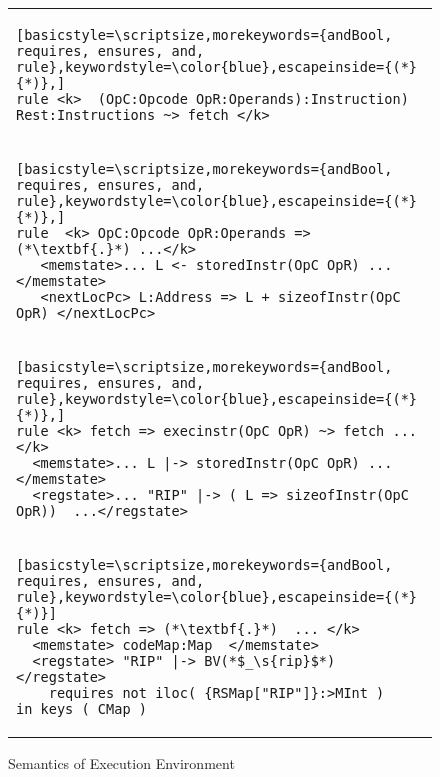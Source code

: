\begin{figure*}[t]
\begin{tabular}{l}      
\begin{lstlisting}[basicstyle=\scriptsize,morekeywords={andBool, requires, ensures, and, rule},keywordstyle=\color{blue},escapeinside={(*}{*)},]
rule <k>  (OpC:Opcode OpR:Operands):Instruction) Rest:Instructions ~> fetch </k>
\end{lstlisting} \\

\begin{lstlisting}[basicstyle=\scriptsize,morekeywords={andBool, requires, ensures, and, rule},keywordstyle=\color{blue},escapeinside={(*}{*)},]
rule  <k> OpC:Opcode OpR:Operands => (*\textbf{.}*) ...</k>
   <memstate>... L <- storedInstr(OpC OpR) ...</memstate>
   <nextLocPc> L:Address => L + sizeofInstr(OpC OpR) </nextLocPc>
\end{lstlisting} \\

\begin{lstlisting}[basicstyle=\scriptsize,morekeywords={andBool, requires, ensures, and, rule},keywordstyle=\color{blue},escapeinside={(*}{*)},]
rule <k> fetch => execinstr(OpC OpR) ~> fetch ... </k>
  <memstate>... L |-> storedInstr(OpC OpR) ...</memstate>
  <regstate>... "RIP" |-> ( L => sizeofInstr(OpC OpR))  ...</regstate>
\end{lstlisting} \\

\begin{lstlisting}[basicstyle=\scriptsize,morekeywords={andBool, requires, ensures, and, rule},keywordstyle=\color{blue},escapeinside={(*}{*)}]
rule <k> fetch => (*\textbf{.}*)  ... </k>
  <memstate> codeMap:Map  </memstate>
  <regstate> "RIP" |-> BV(*$_\s{rip}$*) </regstate>
    requires not iloc( {RSMap["RIP"]}:>MInt ) in_keys ( CMap )
\end{lstlisting} \\


\end{tabular}
        \caption{Semantics of Execution Environment}
        \label{fig:compSema}
\end{figure*}


